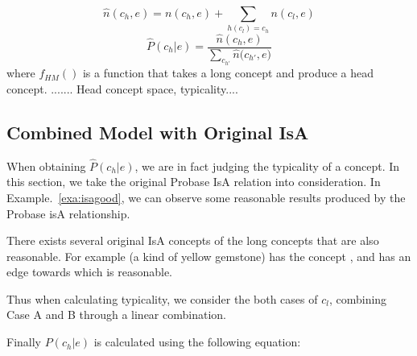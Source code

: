 $$\hat{n}(c_h, e)={n}(c_h, e)+\sum_{ h(c_l)=c_h} n(c_l,e)$$
$$\hat{P}(c_h|e)=\frac{\hat{n}(c_h, e)}{\sum_{c_{h'}}{\hat{n}(c_{h'}}, e)}$$
where $f_{HM}()$ is a function that takes a long concept and produce a head concept.
....... Head concept space, typicality....


\subsection{Combined Model with Original IsA}
When obtaining $\hat{P}(c_h|e)$, we are in fact judging the typicality of a concept.
In this section, we take the original Probase IsA relation into consideration. In Example.~\ref{exa:isagood}, we can observe some reasonable results produced by the Probase isA relationship.

\begin{example}
\label{exa:isagood}
  There exists several original IsA concepts of the long concepts that are also reasonable. For example (a kind of yellow gemstone) has the concept , and  has an edge towards  which is reasonable.
\end{example}


%
Thus when calculating typicality, we consider the both cases of $c_l$, combining Case A and B through a linear combination.

Finally  $P({c_h}|e)$ is calculated using the following equation:

